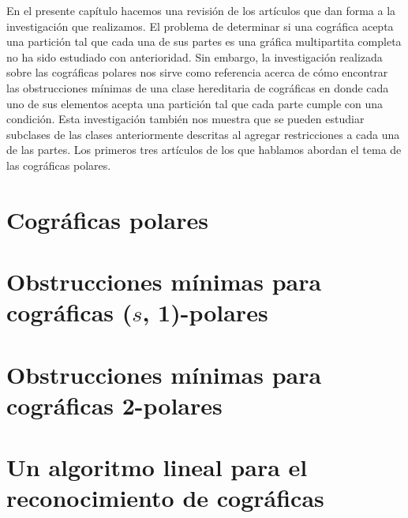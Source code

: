 En el presente capítulo hacemos una revisión de los artículos que dan forma a la investigación que realizamos. El problema de determinar si una cográfica acepta una partición tal que cada una de sus partes es una gráfica multipartita completa no ha sido estudiado con anterioridad. Sin embargo, la investigación realizada sobre las cográficas polares nos sirve como referencia acerca de cómo encontrar las obstrucciones mínimas de una clase hereditaria de cográficas en donde cada uno de sus elementos acepta una partición tal que cada parte cumple con una condición. Esta investigación también nos muestra que se pueden estudiar subclases de las clases anteriormente descritas al agregar restricciones a cada una de las partes. Los primeros tres artículos de los que hablamos abordan el tema de las cográficas polares. %

\section{Cográficas polares}
    

\section{Obstrucciones mínimas para cográficas ($s$, 1)-polares}
    

\section{Obstrucciones mínimas para cográficas 2-polares}
    

\section{Un algoritmo lineal para el reconocimiento de cográficas}
    

